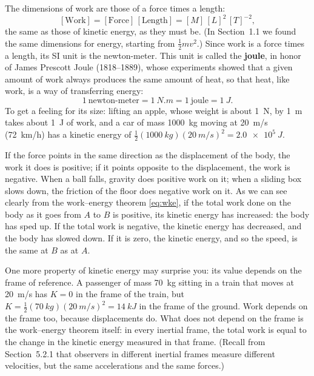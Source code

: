 \documentclass[11pt,a4paper]{article}
\begin{document}
The dimensions of work are those of a force times a length:
\begin{equation}\label{eq:W-dim}
  [\text{Work}] = [\text{Force}]\,[\text{Length}] = [M]\,[L]^2\,[T]^{-2} ,
\end{equation}
the same as those of kinetic energy, as they must be. (In Section~1.1 we found the same dimensions
for energy, starting from $\frac12 mv^2$.) Since work is a force times a length, its SI unit is
the newton-meter. This unit is called the \textbf{joule}, in honor of James Prescott Joule
(1818--1889), whose experiments showed that a given amount of work always produces the same amount
of heat, so that heat, like work, is a way of transferring energy:
\begin{equation}\label{eq:joule}
  1~\text{newton-meter} = \qty[inter-unit-product=\ensuremath{{}\cdot{}}]{1}{N.m} = 1~\text{joule}
  = \qty{1}{J} .
\end{equation}
To get a feeling for its size: lifting an apple, whose weight is about \qty{1}{N}, by \qty{1}{m}
takes about \qty{1}{J} of work, and a car of mass \qty{1000}{kg} moving at \qty{20}{m/s}
(\qty{72}{km/h}) has a kinetic energy of
$\frac12(\qty{1000}{kg})(\qty{20}{m/s})^2 = \qty{2.0e5}{J}$.

If the force points in the same direction as the displacement of the body, the work it does is
positive; if it points opposite to the displacement, the work is negative. When a ball falls, gravity
does positive work on it; when a sliding box slows down, the friction of the floor does negative work
on it. As we can see clearly from the work--energy theorem \eqref{eq:wke}, if the total work done on
the body as it goes from $A$ to $B$ is positive, its kinetic energy has increased: the body has sped
up. If the total work is negative, the kinetic energy has decreased, and the body has slowed down. If
it is zero, the kinetic energy, and so the speed, is the same at $B$ as at $A$.

One more property of kinetic energy may surprise you: its value depends on the frame of reference. A
passenger of mass \qty{70}{kg} sitting in a train that moves at \qty{20}{m/s} has $K = 0$ in the frame
of the train, but $K = \frac12(\qty{70}{kg})(\qty{20}{m/s})^2 = \qty{14}{kJ}$ in the frame of the
ground. Work depends on the frame too, because displacements do. What does not depend on the frame
is the work--energy theorem itself: in every inertial frame, the total work is equal to the change in
the kinetic energy measured in that frame. (Recall from Section~5.2.1 that observers in different
inertial frames measure different velocities, but the same accelerations and the same forces.)
\end{document}
